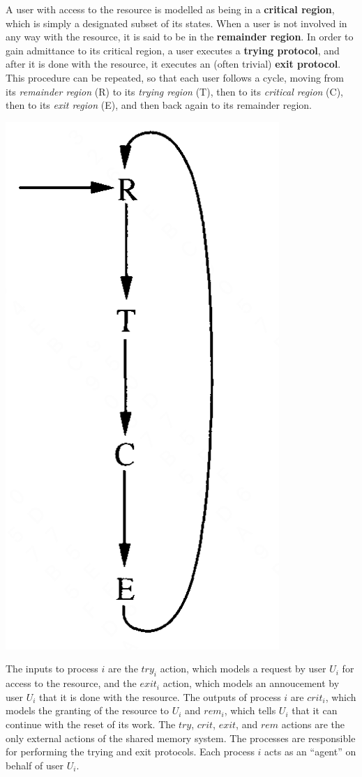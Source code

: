 \documentclass[11pt]{article}
\begin{document}
A user with access to the resource is modelled as being in a \textbf{critical region}, which is simply a
designated subset of its states. When a user is not involved in any way with the resource, it is said
to be in the \textbf{remainder region}. In order to gain admittance to its critical region, a user executes a
\textbf{trying protocol}, and after it is done with the resource, it executes an (often trivial) \textbf{exit protocol}.
This procedure can be repeated, so that each user follows a cycle, moving from its
\emph{remainder region} (R) to its \emph{trying region} (T), then to its \emph{critical region} (C), then to its \emph{exit
region} (E), and then back again to its remainder region.  

\begin{center}
\includegraphics[width=.2\textwidth]{../images/DistributedAlgorithms/1.png}
\end{center}

The inputs to process \(i\) are the \(try_i\) action, which models a request by user \(U_i\) for
access to the resource, and the \(exit_i\) action, which models an annoucement by user \(U_i\) that it
is done with the resource. The outputs of process \(i\) are \(crit_i\), which models the granting of
the resource to \(U_i\) and \(rem_i\), which tells \(U_i\) that it can continue with the reset of its
work. The \(try\), \(crit\), \(exit\), and \(rem\) actions are the only external actions of the shared
memory system. The processes are responsible for performing the trying and exit protocols. Each
process \(i\) acts as an ``agent'' on behalf of user \(U_i\).
\end{document}
